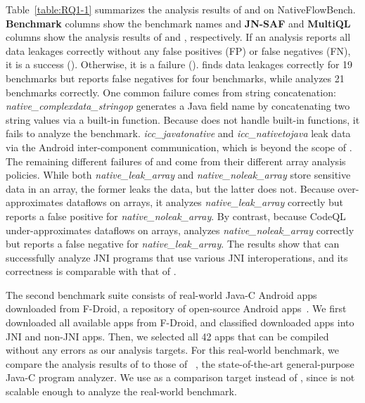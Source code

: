 Table~\ref{table:RQ1-1} summarizes the analysis
results of \jnsaf and \ours on NativeFlowBench.
{\bf Benchmark} columns show the benchmark names
and {\bf JN-SAF} and {\bf MultiQL} columns show 
the analysis results of \jnsaf and \ours, respectively.
If an analysis reports all data leakages correctly without any
false positives (FP) or false negatives (FN), it is a success (\cmark).
Otherwise, it is a failure (\xmark).
\ours finds data leakages correctly for 19 benchmarks but reports false
negatives for four benchmarks, while \jnsaf analyzes 21 benchmarks correctly. 
One common failure comes from string concatenation:
{\it native\_complexdata\_stringop} generates a Java field name by
concatenating two string values via a built-in function.
Because \ours does not handle built-in functions, it fails to analyze the benchmark.
{\it icc\_javatonative} and {\it icc\_nativetojava} leak data via the Android
inter-component communication, which is beyond the scope of \ours.
The remaining different failures of \ours and \jnsaf come from
their different array analysis policies.
While both {\it native\_leak\_array} and {\it native\_noleak\_array} store sensitive data in an array,
the former leaks the data, but the latter does not.
Because \jnsaf over-approximates dataflows on arrays,
it analyzes {\it native\_leak\_array} correctly but reports a false positive for {\it native\_noleak\_array}.
By contrast, because CodeQL under-approximates dataflows on arrays,
\ours analyzes {\it native\_noleak\_array} correctly but reports a false negative for
{\it native\_leak\_array}.
%
The results show that \ours can successfully analyze JNI programs that
use various JNI interoperations, and its correctness is comparable with that of \jnsaf.

The second benchmark suite consists of real-world Java-C Android apps downloaded from
F-Droid, a repository of open-source Android apps~\cite{fdroid}.  We first
downloaded all available apps from F-Droid, and classified downloaded apps into JNI and non-JNI apps.
Then, we selected all 42 apps that can be compiled without any errors as our analysis targets.
For this real-world benchmark, we compare the analysis results of
\ours to those of \lees~\cite{LeeASE20},
the state-of-the-art general-purpose Java-C program analyzer.
We use \lees as a comparison target instead of \jnsaf,
since \jnsaf is not scalable enough to analyze the real-world benchmark.



